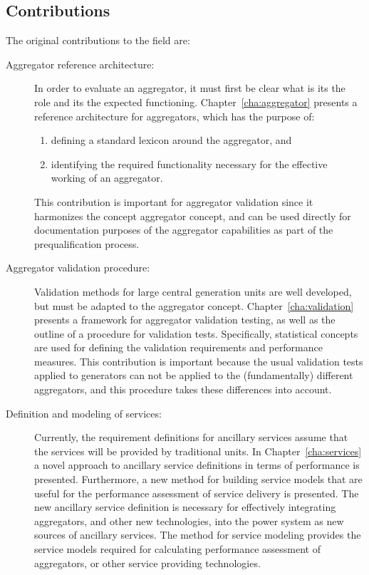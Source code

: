 \subsection*{Contributions}
The original contributions to the field are:
\begin{description}
	\item[Aggregator reference architecture:] In order to evaluate an aggregator, it must first be clear what is its the role and its the expected functioning. Chapter~\ref{cha:aggregator} presents a reference architecture for aggregators, which has the purpose of:
		\begin{enumerate}
			\item defining a standard lexicon around the aggregator, and
			\item identifying the required functionality necessary for the effective working of an aggregator.
		\end{enumerate}
		This contribution is important for aggregator validation since it harmonizes the concept aggregator concept, and can be used directly for documentation purposes of the aggregator capabilities as part of the prequalification process.%
	\item[Aggregator validation procedure:] Validation methods for large central generation units are well developed, but must be adapted to the aggregator concept. Chapter~\ref{cha:validation} presents a framework for aggregator validation testing, as well as the outline of a procedure for validation tests. Specifically, statistical concepts are used for defining the validation requirements and performance measures. This contribution is important because the usual validation tests applied to generators can not be applied to the (fundamentally) different aggregators, and this procedure takes these differences into account.
	\item[Definition and modeling of services:] Currently, the requirement definitions for ancillary services assume that the services will be provided by traditional units. In Chapter~\ref{cha:services} a novel approach to ancillary service definitions in terms of performance is presented. Furthermore, a new method for building service models that are useful for the performance assessment of service delivery is presented. The new ancillary service definition is necessary for effectively integrating aggregators, and other new technologies, into the power system as new sources of ancillary services. The method for service modeling provides the service models required for calculating performance assessment of aggregators, or other service providing technologies.

\end{description}

